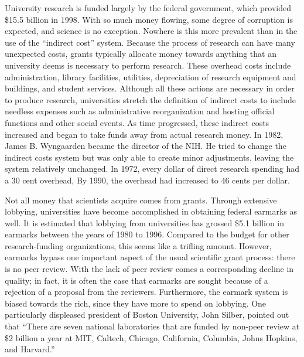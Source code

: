 \documentclass{article}[12pt]
\begin{document}
University research is funded largely by the federal government, which provided
\$15.5 billion in 1998. With so much money flowing, some degree
of corruption is expected, and science is no exception. Nowhere is this more
prevalent than in the use of the ``indirect cost'' system. Because the process
of research can have many unexpected costs, grants typically allocate money
towards anything that an university deems is necessary to perform research.
These overhead costs include administration, library facilities, utilities,
depreciation of research equipment and buildings, and student services.
Although all these actions are necessary in order to produce research,
universities stretch the definition of indirect costs to include needless
expenses such as administrative reorganization and hosting official functions
and other social events.  As time progressed, these indirect
costs increased and began to take funds away from actual research money.  In
1982, James B. Wyngaarden became the director of the NIH.  He tried to change
the indirect costs system but was only able to create minor adjustments,
leaving the system relatively unchanged.  In 1972, every dollar of direct
research spending had a 30 cent overhead,  By 1990, the overhead had increased
to 46 cents per dollar.  

Not all money that scientists acquire comes from grants. Through extensive
lobbying, universities have become accomplished in obtaining federal earmarks
as well. It is estimated that lobbying from universities has grossed \$5.1
billion in earmarks between the years of 1980 to 1996. Compared
to the budget for other research-funding organizations, this seems like a
trifling amount. However, earmarks bypass one important aspect of the usual
scientific grant process: there is no peer review. With the lack of peer review
comes a corresponding decline in quality; in fact, it is often the case that
earmarks are sought because of a rejection of a proposal from the
reviewers. Furthermore, the earmark system is biased
towards the rich, since they have more to spend on lobbying. One particularly
displeased president of Boston University, John Silber, pointed out that
``There are seven national laboratories that are funded by non-peer review at
\$2 billion a year at MIT, Caltech, Chicago, California, Columbia, Johns
Hopkins, and Harvard.''
\end{document}
